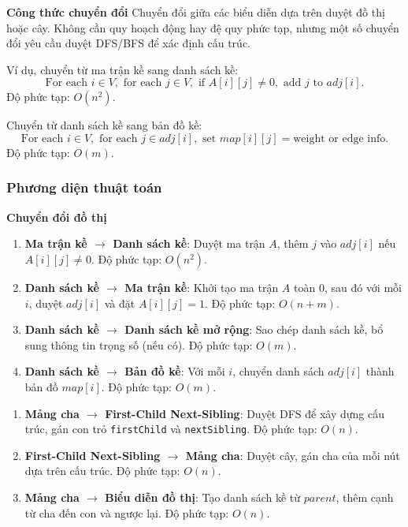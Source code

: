 \documentclass[a4paper,12pt]{article}
\begin{document}
\textbf{Công thức chuyển đổi}
Chuyển đổi giữa các biểu diễn dựa trên duyệt đồ thị hoặc cây. Không cần quy hoạch động hay đệ quy phức tạp, nhưng một số chuyển đổi yêu cầu duyệt DFS/BFS để xác định cấu trúc.

Ví dụ, chuyển từ ma trận kề sang danh sách kề:
\[
\text{For each } i \in V, \text{ for each } j \in V, \text{ if } A[i][j] \neq 0, \text{ add } j \text{ to } adj[i].
\]
Độ phức tạp: \( O(n^2) \).

Chuyển từ danh sách kề sang bản đồ kề:
\[
\text{For each } i \in V, \text{ for each } j \in adj[i], \text{ set } map[i][j] = \text{weight or edge info}.
\]
Độ phức tạp: \( O(m) \).

\subsubsection{Phương diện thuật toán}

\textbf{Chuyển đổi đồ thị}
\begin{enumerate}
    \item \textbf{Ma trận kề \(\to\) Danh sách kề}: Duyệt ma trận \( A \), thêm \( j \) vào \( adj[i] \) nếu \( A[i][j] \neq 0 \). Độ phức tạp: \( O(n^2) \).
    \item \textbf{Danh sách kề \(\to\) Ma trận kề}: Khởi tạo ma trận \( A \) toàn 0, sau đó với mỗi \( i \), duyệt \( adj[i] \) và đặt \( A[i][j] = 1 \). Độ phức tạp: \( O(n + m) \).
    \item \textbf{Danh sách kề \(\to\) Danh sách kề mở rộng}: Sao chép danh sách kề, bổ sung thông tin trọng số (nếu có). Độ phức tạp: \( O(m) \).
    \item \textbf{Danh sách kề \(\to\) Bản đồ kề}: Với mỗi \( i \), chuyển danh sách \( adj[i] \) thành bản đồ \( map[i] \). Độ phức tạp: \( O(m) \).
\end{enumerate}

\begin{enumerate}
    \item \textbf{Mảng cha \(\to\) First-Child Next-Sibling}: Duyệt DFS để xây dựng cấu trúc, gán con trỏ \texttt{firstChild} và \texttt{nextSibling}. Độ phức tạp: \( O(n) \).
    \item \textbf{First-Child Next-Sibling \(\to\) Mảng cha}: Duyệt cây, gán cha của mỗi nút dựa trên cấu trúc. Độ phức tạp: \( O(n) \).
    \item \textbf{Mảng cha \(\to\) Biểu diễn đồ thị}: Tạo danh sách kề từ \( parent \), thêm cạnh từ cha đến con và ngược lại. Độ phức tạp: \( O(n) \).
\end{enumerate}
\end{document}
